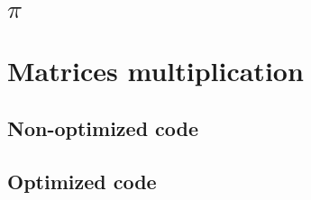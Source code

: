 \section{$\pi$}


\label{pi}

\section{Matrices multiplication}

\subsection{Non-optimized code}
\label{matmul}


\subsection{Optimized code}
\label{matmulot}


